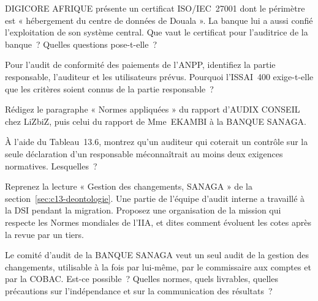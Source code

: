 \begin{boxexo}[title={\ding{45}\quad Exercice~13.5. Un certificat ISO/IEC 27001 \niveaumoyen}]
DIGICORE AFRIQUE présente un certificat ISO/IEC~27001 dont le périmètre est
« hébergement du centre de données de Douala ». La banque lui a aussi
confié l'exploitation de son système central. Que vaut le certificat pour
l'auditrice de la banque~? Quelles questions pose-t-elle~?
\end{boxexo}

\begin{boxexo}[title={\ding{45}\quad Exercice~13.6. Les trois parties \niveaumoyen}]
Pour l'audit de conformité des paiements de l'ANPP, identifiez la partie
responsable, l'auditeur et les utilisateurs prévus. Pourquoi l'ISSAI~400
exige-t-elle que les critères soient connus de la partie responsable~?
\end{boxexo}

\begin{boxexo}[title={\ding{45}\quad Exercice~13.7. Citer la norme \niveaumoyen}]
Rédigez le paragraphe « Normes appliquées » du rapport d'AUDIX CONSEIL chez
LiZbiZ, puis celui du rapport de Mme~EKAMBI à la BANQUE SANAGA.
\end{boxexo}

\begin{boxexo}[title={\ding{45}\quad Exercice~13.8. La correspondance \niveaumoyen}]
À l'aide du Tableau~13.6, montrez qu'un auditeur qui coterait \OUI{} un
contrôle sur la seule déclaration d'un responsable méconnaîtrait au moins
deux exigences normatives. Lesquelles~?
\end{boxexo}

\begin{boxexo}[title={\ding{45}\quad Exercice~13.9. Le conflit à la BANQUE SANAGA \niveauexpert}]
Reprenez la lecture « Gestion des changements, SANAGA » de la
section~\ref{sec:c13-deontologie}. Une partie de l'équipe d'audit interne a
travaillé à la DSI pendant la migration. Proposez une organisation de la
mission qui respecte les Normes mondiales de l'IIA, et dites comment
évoluent les cotes après la revue par un tiers.
\end{boxexo}

\begin{boxexo}[title={\ding{45}\quad Exercice~13.10. Un audit, trois lecteurs \niveauexpert}]
Le comité d'audit de la BANQUE SANAGA veut un seul audit de la gestion des
changements, utilisable à la fois par lui-même, par le commissaire aux
comptes et par la COBAC. Est-ce possible~? Quelles normes, quels livrables,
quelles précautions sur l'indépendance et sur la communication des
résultats~?
\end{boxexo}

